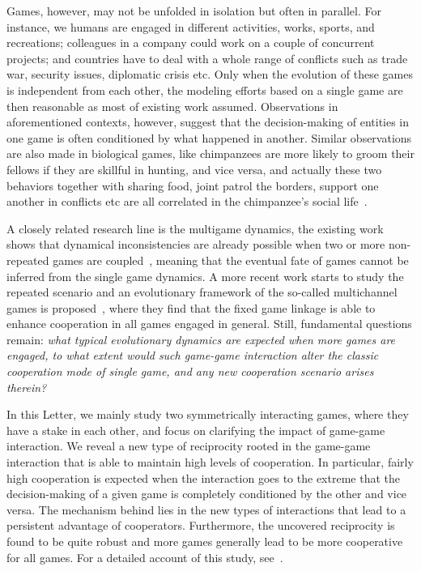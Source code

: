 \documentclass[doublecol]{epl2}
\begin{document}
Games, however, may not be unfolded in isolation but often in parallel. For instance, we humans are engaged in different activities, works, sports, and recreations; colleagues in a company could work on a couple of concurrent projects; and countries have to deal with a whole range of conflicts such as trade war, security issues, diplomatic crisis etc. Only when the evolution of these games is independent from each other, the modeling efforts based on a single game are then reasonable as most of existing work assumed. Observations in aforementioned contexts, however, suggest that the decision-making of entities in one game is often conditioned by what happened in another. Similar observations are also made in biological games, like chimpanzees are more likely to groom their fellows if they are skillful in hunting, and vice versa, and actually these two behaviors together with sharing food, joint patrol the borders, support one another in conflicts etc are all correlated in the chimpanzee's social life~\cite{hammerstein2003genetic}.

A closely related research line is the multigame dynamics, the existing work shows that dynamical inconsistencies are already possible when two or more non-repeated games are coupled~\cite{cressman2000evolutionary,chamberland2000example,hashimoto2006unpredictability,venkateswaran2019evolutionary}, meaning that the eventual fate of games cannot be inferred from the single game dynamics. A more recent work starts to study the repeated scenario and an evolutionary framework of the so-called multichannel games is proposed~\cite{donahue2020evolving}, where they find that the fixed game linkage is able to enhance cooperation in all games engaged in general. Still, fundamental questions remain: \emph{what typical evolutionary dynamics are expected when more games are engaged, to what extent would such game-game interaction alter the classic cooperation mode of single game, and any new cooperation scenario arises therein?}

In this Letter, we mainly study two symmetrically interacting games, where they have a stake in each other, and focus on clarifying the impact of game-game interaction. We reveal a new type of reciprocity rooted in the game-game interaction that is able to maintain high levels of cooperation. In particular, fairly high cooperation is expected when the interaction goes to the extreme that the decision-making of a given game is completely conditioned by the other and vice versa. The mechanism behind lies in the new types of interactions that lead to a persistent advantage of cooperators. Furthermore, the uncovered reciprocity is found to be quite robust and more games generally lead to be more cooperative for all games. For a detailed account of this study, see~\cite{Liang2021arXiv}.
\end{document}

